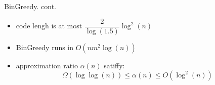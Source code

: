\documentclass[xcolor=dvipsnames, aspectratio=169]{beamer}
\begin{document}
\begin{frame}{BinGreedy. cont.}
	\begin{theorem}[efficency]
			\begin{itemize}
			\item<1-> code lengh is at most $\dfrac{2}{\log(1.5)} \log^2(n)$
			 \item<2-> BinGreedy runs in $O(n m^2 \log(n))$ 
			\item<3-> approximation ratio $\alpha(n)$ satiffy: 	$$\Omega(\log \log (n)) \leq \alpha(n) \leq O(\log^2(n))$$
			\end{itemize}
	\end{theorem}
\end{frame}
%         
\end{document}

